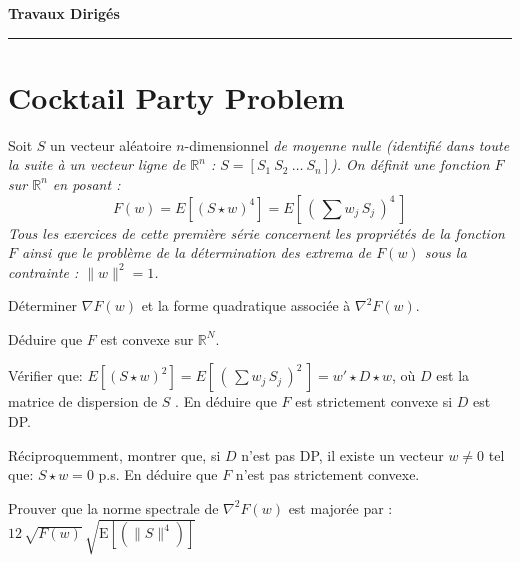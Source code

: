\documentclass[12pt,a4paper,fleqn]{report}
\makeatletter
\def\cleardoublepage{\clearpage\if@twoside\ifodd\c@page\else\hbox{}\thispagestyle{empty}\newpage\fi\fi}
\newcommand{\R}{\mathbb R}
\newcommand{\grad}{\nabla}
\newcommand{\hess}{\nabla^2}
\newcommand{\on}{\begin{displaymath}}
\newcommand{\off}{\end{displaymath}}
\makeatother
\begin{document}
\cleardoublepage



\begin{center}

\textbf{\huge Travaux Dirig\'es }

\smallskip

\rule{10cm}{0.4pt}

\end{center}


\section{Cocktail Party Problem}

Soit $S$ un vecteur aléatoire $n$-dimensionnel  \it de moyenne nulle \rm (identifié dans toute la suite à un vecteur ligne de $\R^n$ : $S=[S_1\ S_2\ \ldots\ S_n]$).
On définit une fonction $F$ sur $\R^n$ en posant : 
\on F(w)=E[(S\star w)^4]=E\left[\,\left( \,\sum w_j\,S_j\,\right)^4\,\right] \off
Tous les exercices de cette première série concernent les propriétés de  la fonction $F$ ainsi que le problème de la détermination des extrema de $F(w)$ sous la contrainte : $\|w\|^2=1$. 

\begin{exercice}
\rien
\begin{questions}
\item Déterminer  $ \grad F(w)$ et  la forme quadratique associée à $\hess F(w)$.
\item Déduire que $F$ est convexe sur $\R^N$.
\item Vérifier que: 
\mbox{$ E[(S\star w)^2]=E\left[\,\left( \,\sum w_j\,S_j\,\right)^2\,\right] =w'\star D\star w $}, 
où $D$ est la matrice de dispersion de $S$ . En déduire que $F$ est strictement convexe si  $D$ est DP.
\item Réciproquemment, montrer que, si $D$ n'est pas DP, il existe un vecteur $w\neq 0$ tel que: $S\star w=0$ p.s. En déduire que $F$ n'est pas strictement convexe.  
\item Prouver que la norme spectrale de $\hess F(w)$  est majorée par :  $12\,\sqrt{F(w)}\,\sqrt{ \mbox{E} [(\| S\|^4)]}$\end{questions}
\end{exercice}
\end{document}
